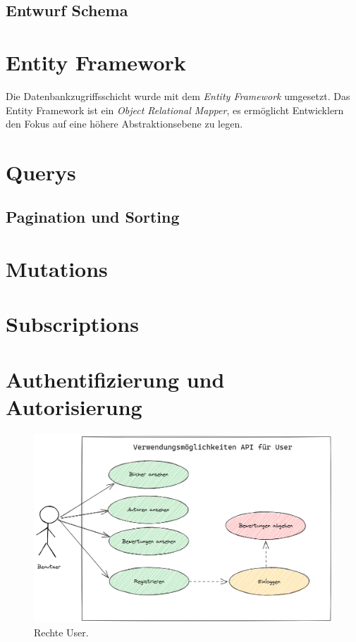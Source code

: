 \subsection{Entwurf Schema}

\section{Entity Framework}
Die Datenbankzugriffsschicht wurde mit dem \textit{Entity Framework} umgesetzt.
Das Entity Framework ist ein \textit{Object Relational Mapper}, es ermöglicht Entwicklern den Fokus auf eine höhere Abstraktionsebene zu legen.


\section{Querys}
\subsection{Pagination und Sorting}

\section{Mutations}

\section{Subscriptions}

\section{Authentifizierung und Autorisierung}

\begin{figure}[H]
    \includegraphics[width=\textwidth]{pics/UseCaseUser.png}
    \caption{Rechte User.}
\end{figure}

